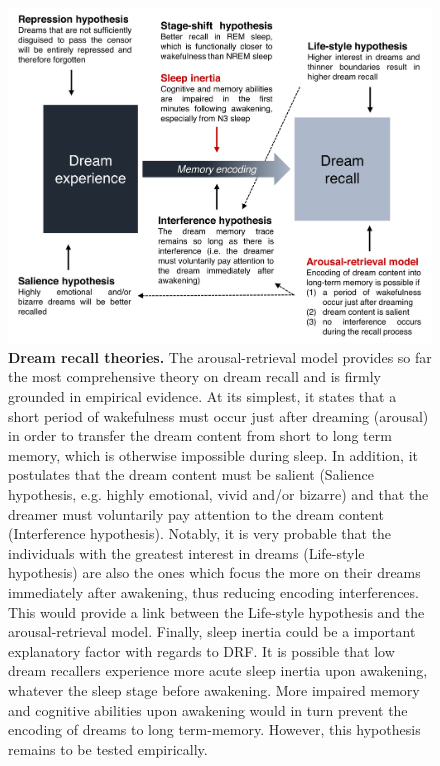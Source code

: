 \begin{figure}[!htb]
	\includegraphics[width=\textwidth]{Fig/Intro/Intro_DRF_model/Intro_DRF_model.png}
	\caption[Dream recall theories]{\textbf{Dream recall theories.} The arousal-retrieval model provides so far the most comprehensive theory on dream recall and is firmly grounded in empirical evidence. At its simplest, it states that a short period of wakefulness must occur just after dreaming (arousal) in order to transfer the dream content from short to long term memory, which is otherwise impossible during sleep. In addition, it postulates that the dream content must be salient (Salience hypothesis, e.g. highly emotional, vivid and/or bizarre) and that the dreamer must voluntarily pay attention to the dream content (Interference hypothesis). Notably, it is very probable that the individuals with the greatest interest in dreams (Life-style hypothesis) are also the ones which focus the more on their dreams immediately after awakening, thus reducing encoding interferences. This would provide a link between the Life-style hypothesis and the arousal-retrieval model. Finally, sleep inertia could be a important explanatory factor with regards to DRF. It is possible that low dream recallers experience more acute sleep inertia upon awakening, whatever the sleep stage before awakening. More impaired memory and cognitive abilities upon awakening would in turn prevent the encoding of dreams to long term-memory. However, this hypothesis remains to be tested empirically.}
	\label{fig:intro:dream-recall-models}
\end{figure}

